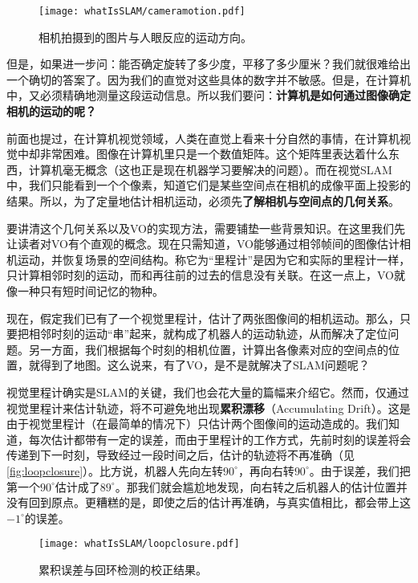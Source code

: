 \begin{figure}[!ht]
	\centering
	\texttt{[image: whatIsSLAM/cameramotion.pdf]}
	\caption{相机拍摄到的图片与人眼反应的运动方向。}
	\label{fig:cameramotion}
\end{figure}

但是，如果进一步问：能否确定旋转了多少度，平移了多少厘米？我们就很难给出一个确切的答案了。因为我们的直觉对这些具体的数字并不敏感。但是，在计算机中，又必须精确地测量这段运动信息。所以我们要问：\textbf{计算机是如何通过图像确定相机的运动的呢？}

前面也提过，在计算机视觉领域，人类在直觉上看来十分自然的事情，在计算机视觉中却非常困难。图像在计算机里只是一个数值矩阵。这个矩阵里表达着什么东西，计算机毫无概念（这也正是现在机器学习要解决的问题）。而在视觉SLAM中，我们只能看到一个个像素，知道它们是某些空间点在相机的成像平面上投影的结果。所以，为了定量地估计相机运动，必须先\textbf{了解相机与空间点的几何关系}。

要讲清这个几何关系以及VO的实现方法，需要铺垫一些背景知识。在这里我们先让读者对VO有个直观的概念。现在只需知道，VO能够通过相邻帧间的图像估计相机运动，并恢复场景的空间结构。称它为“里程计”是因为它和实际的里程计一样，只计算相邻时刻的运动，而和再往前的过去的信息没有关联。在这一点上，VO就像一种只有短时间记忆的物种。

现在，假定我们已有了一个视觉里程计，估计了两张图像间的相机运动。那么，只要把相邻时刻的运动“串”起来，就构成了机器人的运动轨迹，从而解决了定位问题。另一方面，我们根据每个时刻的相机位置，计算出各像素对应的空间点的位置，就得到了地图。这么说来，有了VO，是不是就解决了SLAM问题呢？

视觉里程计确实是SLAM的关键，我们也会花大量的篇幅来介绍它。然而，仅通过视觉里程计来估计轨迹，将不可避免地出现\textbf{累积漂移}（Accumulating Drift）。这是由于视觉里程计（在最简单的情况下）只估计两个图像间的运动造成的。我们知道，每次估计都带有一定的误差，而由于里程计的工作方式，先前时刻的误差将会传递到下一时刻，导致经过一段时间之后，估计的轨迹将不再准确（见\autoref{fig:loopclosure}）。比方说，机器人先向左转$90^\circ$，再向右转$90^\circ$。由于误差，我们把第一个$90^\circ$估计成了$89^\circ$。那我们就会尴尬地发现，向右转之后机器人的估计位置并没有回到原点。更糟糕的是，即使之后的估计再准确，与真实值相比，都会带上这$-1^\circ$的误差。

\begin{figure}[!htp]
	\centering
	\texttt{[image: whatIsSLAM/loopclosure.pdf]}
	\caption{累积误差与回环检测的校正结果\textsuperscript{\cite{Newman2005}}。}
	\label{fig:loopclosure}
\end{figure}

